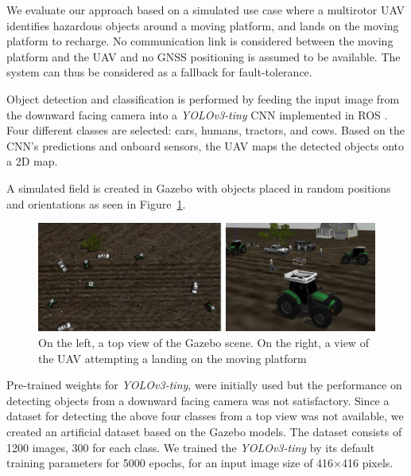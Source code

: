 \documentclass[conference]{IEEEtran}
\begin{document}
We evaluate our approach based on a simulated use case where %
a multirotor UAV identifies
hazardous objects around a moving platform, and lands on the
moving platform to recharge.
%
%
No communication link is considered between the moving platform and the UAV
and no GNSS positioning is assumed to be available. The system can thus be
considered as a fallback for fault-tolerance.


Object detection and classification is performed by feeding the input
image from the downward facing camera into a \emph{YOLOv3-tiny} CNN
\cite{yolov3} implemented in ROS \cite{bjelonicYolo2018}. Four
different classes are selected: cars, humans, tractors, and
cows. Based on the CNN's predictions and onboard
sensors, the UAV maps the detected objects onto a 2D map.
 

A simulated field is created in Gazebo with objects placed in random
positions and orientations as seen in Figure~\ref{fig:Gazebo}.

\begin{figure}[t]
\centering
\includegraphics[scale=0.2]{gazebo_scalled.png}
\caption{On the left, a top view of the Gazebo scene. On the right, a view of the UAV attempting a landing on the moving platform }
\label{fig:Gazebo}
\end{figure}

Pre-trained weights for \emph{YOLOv3-tiny}, were initially used but the
performance on detecting objects from a downward facing camera was
not satisfactory. Since a dataset for detecting the above four classes
from a top view was not available, we created an artificial dataset
based on the Gazebo models. The dataset consists of 1200 images, 300
for each class. We trained the \emph{YOLOv3-tiny} by its default training
parameters for 5000 epochs, for an input image size of 416$\times$416
pixels.
\end{document}
